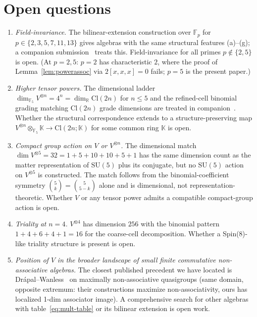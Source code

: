 \documentclass[11pt,reqno]{amsart}
\theoremstyle{plain}
\theoremstyle{definition}
\theoremstyle{remark}
\newcommand{\F}{\mathbb{F}}
\newcommand{\R}{\mathbb{R}}
\newcommand{\Cl}{\mathrm{Cl}}
\begin{document}
\section{Open questions}
\label{sec:open}

\begin{enumerate}
\item \emph{Field-invariance.} The bilinear-extension construction over $\F_p$ for $p \in \{2, 3, 5, 7, 11, 13\}$ gives algebras with the same structural features (a)--(g); a companion submission~\cite{SandersGishFpUniversality} treats this. Field-invariance for all primes $p \notin \{2, 5\}$ is open. (At $p = 2, 5$: $p = 2$ has characteristic $2$, where the proof of Lemma~\ref{lem:powerassoc} via $2 [x, x, x] = 0$ fails; $p = 5$ is the present paper.)
\item \emph{Higher tensor powers.} The dimensional ladder $\dim_{\F_5} V^{\otimes n} = 4^n = \dim_\R \Cl(2n)$ for $n \leq 5$ and the refined-cell binomial grading matching $\Cl(2n)$ grade dimensions are treated in companion~\cite{SandersGishCliffordLadder}. Whether the structural correspondence extends to a structure-preserving map $V^{\otimes n} \otimes_{\F_5} \mathbb{K} \to \Cl(2n; \mathbb{K})$ for some common ring $\mathbb{K}$ is open.
\item \emph{Compact group action on $V$ or $V^{\otimes n}$.} The dimensional match $\dim V^{\otimes 5} = 32 = 1 + 5 + 10 + 10 + 5 + 1$ has the same dimension count as the matter representation of $\mathrm{SU}(5)$ plus its conjugate, but no $\mathrm{SU}(5)$ action on $V^{\otimes 5}$ is constructed. The match follows from the binomial-coefficient symmetry $\binom{5}{k} = \binom{5}{5-k}$ alone and is dimensional, not representation-theoretic. Whether $V$ or any tensor power admits a compatible compact-group action is open.
\item \emph{Triality at $n = 4$.} $V^{\otimes 4}$ has dimension $256$ with the binomial pattern $1 + 4 + 6 + 4 + 1 = 16$ for the coarse-cell decomposition. Whether a Spin(8)-like triality structure is present is open.
\item \emph{Position of $V$ in the broader landscape of small finite commutative non-associative algebras.} The closest published precedent we have located is Drápal--Wanless~\cite{DrapalWanless2021} on maximally non-associative quasigroups (same domain, opposite extremum: their constructions maximize non-associativity, ours has localized 1-dim associator image). A comprehensive search for other algebras with table~\eqref{eq:mult-table} or its bilinear extension is open work.
\end{enumerate}
\end{document}
